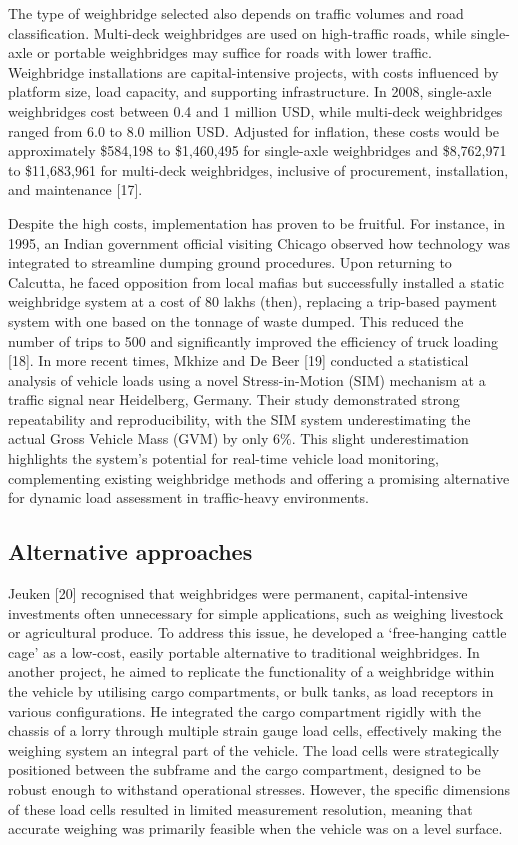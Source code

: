 The type of weighbridge selected also depends on traffic volumes and road classification. Multi-deck weighbridges are used on high-traffic roads, while single-axle or portable weighbridges may suffice for roads with lower traffic. Weighbridge installations are capital-intensive projects, with costs influenced by platform size, load capacity, and supporting infrastructure. In 2008, single-axle weighbridges cost between 0.4 and 1 million USD, while multi-deck weighbridges ranged from 6.0 to 8.0 million USD. Adjusted for inflation, these costs would be approximately \$584,198 to \$1,460,495 for single-axle weighbridges and \$8,762,971 to \$11,683,961 for multi-deck weighbridges, inclusive of procurement, installation, and maintenance [17].

Despite the high costs, implementation has proven to be fruitful. For instance, in 1995, an Indian government official visiting Chicago observed how technology was integrated to streamline dumping ground procedures. Upon returning to Calcutta, he faced opposition from local mafias but successfully installed a static weighbridge system at a cost of 80 lakhs (then), replacing a trip-based payment system with one based on the tonnage of waste dumped. This reduced the number of trips to 500 and significantly improved the efficiency of truck loading [18]. In more recent times, Mkhize and De Beer [19] conducted a statistical analysis of vehicle loads using a novel Stress-in-Motion (SIM) mechanism at a traffic signal near Heidelberg, Germany. Their study demonstrated strong repeatability and reproducibility, with the SIM system underestimating the actual Gross Vehicle Mass (GVM) by only 6\%. This slight underestimation highlights the system's potential for real-time vehicle load monitoring, complementing existing weighbridge methods and offering a promising alternative for dynamic load assessment in traffic-heavy environments.

\subsection{Alternative approaches}

Jeuken [20] recognised that weighbridges were permanent, capital-intensive investments often unnecessary for simple applications, such as weighing livestock or agricultural produce. To address this issue, he developed a `free-hanging cattle cage' as a low-cost, easily portable alternative to traditional weighbridges. In another project, he aimed to replicate the functionality of a weighbridge within the vehicle by utilising cargo compartments, or bulk tanks, as load receptors in various configurations. He integrated the cargo compartment rigidly with the chassis of a lorry through multiple strain gauge load cells, effectively making the weighing system an integral part of the vehicle. The load cells were strategically positioned between the subframe and the cargo compartment, designed to be robust enough to withstand operational stresses. However, the specific dimensions of these load cells resulted in limited measurement resolution, meaning that accurate weighing was primarily feasible when the vehicle was on a level surface.

